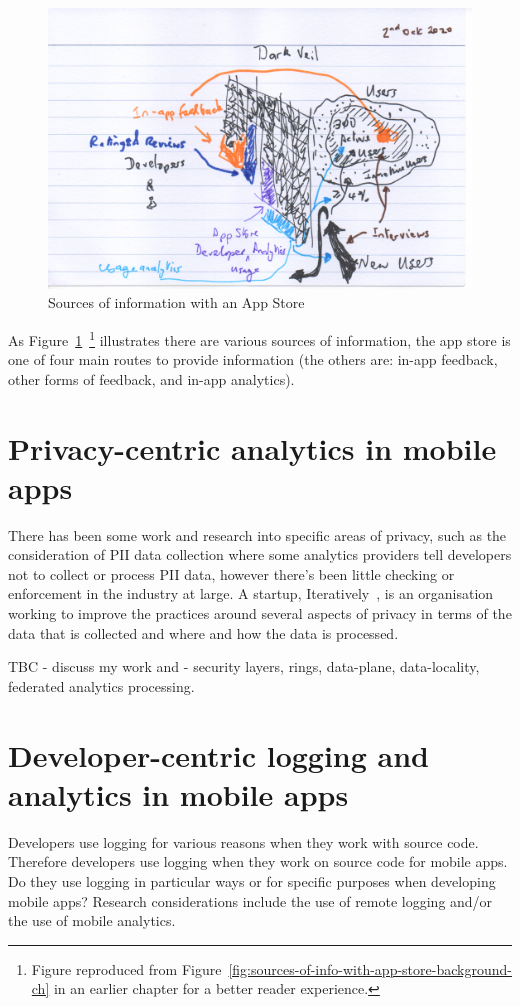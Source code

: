 \begin{figure}[htbp!]
    \centering
    \includegraphics[width=13cm]{images/rough-sketches/sources-of-information-with-app-store-1.png}
    \caption{Sources of information with an App Store}
    \label{fig:sources-of-info-with-app-store-future-work-ch}
\end{figure}

As Figure~\ref{fig:sources-of-info-with-app-store-future-work-ch}~\footnote{Figure reproduced from Figure~\ref{fig:sources-of-info-with-app-store-background-ch} in an earlier chapter for a better reader experience.} illustrates there are various sources of information, the app store is one of four main routes to provide information (the others are: in-app feedback, other forms of feedback, and in-app analytics).

\section{Privacy-centric analytics in mobile apps}
There has been some work and research into specific areas of privacy, such as the consideration of PII data collection where some analytics providers tell developers not to collect or process PII data, however there's been little checking or enforcement in the industry at large. A startup, Iteratively~\citep{iteratively_homepage}, is an organisation working to improve the practices around several aspects of privacy in terms of the data that is collected and where and how the data is processed.

TBC - discuss my work and - security layers, rings, data-plane, data-locality, federated analytics processing.

\section{Developer-centric logging and analytics in mobile apps}
Developers use logging for various reasons when they work with source code. Therefore developers use logging when they work on source code for mobile apps. Do they use logging in particular ways or for specific purposes when developing mobile apps? Research considerations include the use of remote logging and/or the use of mobile analytics.

